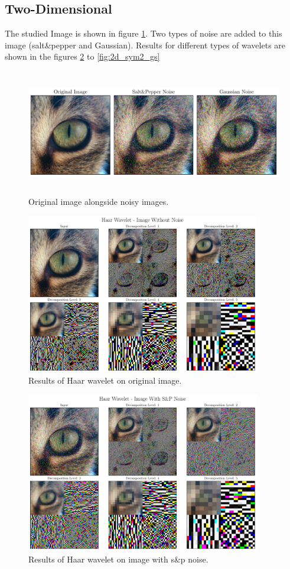 \documentclass[12pt]{article}
\begin{document}
	\subsection{Two-Dimensional}
	
	The studied Image is shown in figure \ref{fig:2d_image}. Two types of noise are added to this image (salt\&pepper and Gaussian). Results for different types of wavelets are shown in the figures \ref{fig:2d_haar} to \ref{fig:2d_sym2_gs}
	
	\begin{figure}[!h]
		\centering
		\includegraphics[height=5.5cm]{../Tests/Outputs/2D_Image.pdf}
		\caption{Original image alongside noisy images.}
		\label{fig:2d_image}
	\end{figure}

	\begin{figure}[!h]
		\centering
		\includegraphics[height=7cm]{../Tests/Outputs/2D_HaarWavelet_WithoutNoise.pdf}
		\caption{Results of Haar wavelet on original image.}
		\label{fig:2d_haar}
	\end{figure}

	\begin{figure}[!h]
		\centering
		\includegraphics[height=7cm]{../Tests/Outputs/2D_HaarWavelet_SPNoise.pdf}
		\caption{Results of Haar wavelet on image with s\&p noise.}
		\label{fig:2d_haar_sp}
	\end{figure}
	
\end{document}
